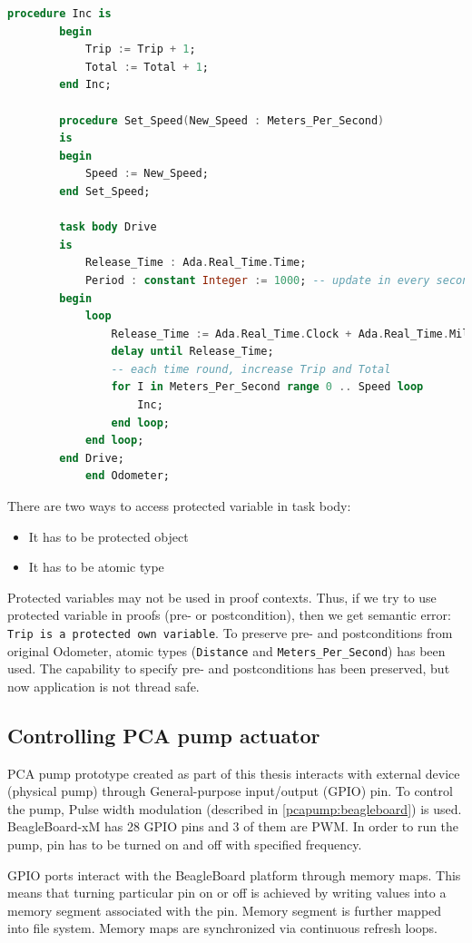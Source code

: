 \begin{lstlisting}[language=ada, frame=single, gobble=0, caption={Multitasking Odometer}]
	    procedure Inc is
	    begin
	        Trip := Trip + 1;
	        Total := Total + 1;
	    end Inc;
	    
	    procedure Set_Speed(New_Speed : Meters_Per_Second)
	    is
	    begin
	        Speed := New_Speed;
	    end Set_Speed;    
	    
	    task body Drive
	    is
	        Release_Time : Ada.Real_Time.Time;
	        Period : constant Integer := 1000; -- update in every second
	    begin
	        loop
	            Release_Time := Ada.Real_Time.Clock + Ada.Real_Time.Milliseconds(Period);
	            delay until Release_Time;
	            -- each time round, increase Trip and Total
	            for I in Meters_Per_Second range 0 .. Speed loop
	                Inc;
	            end loop;            
	        end loop;
	    end Drive;
	    	end Odometer;
\end{lstlisting} 
\label{listing:Odometer2005Tasking}

There are two ways to access protected variable in task body:
\begin{itemize}
    \item It has to be protected object
    \item It has to be atomic type
\end{itemize}

Protected variables may not be used in proof contexts. Thus, if we try to use protected variable in proofs (pre- or postcondition), then we get semantic error: \lstinline{Trip is a protected own variable}. To preserve pre- and postconditions from original Odometer, atomic types (\lstinline{Distance} and \lstinline{Meters_Per_Second}) has been used. The capability to specify pre- and postconditions has been preserved, but now application is not thread safe.


\subsection{Controlling PCA pump actuator}
\label{pcapumpimpl:beagleboard:pcapumpmotor}

PCA pump prototype created as part of this thesis interacts with external device (physical pump) through General-purpose input/output (GPIO) pin. To control the pump, Pulse width modulation (described in \ref{pcapump:beagleboard}) is used. BeagleBoard-xM has 28 GPIO pins and 3 of them are PWM. In order to run the pump, pin has to be turned on and off with specified frequency.

GPIO ports interact with the BeagleBoard platform through memory maps. This means that turning particular pin on or off is achieved by writing values into a memory segment associated with the pin. Memory segment is further mapped into file system. Memory maps are synchronized via continuous refresh loops.

